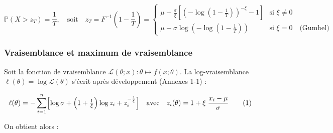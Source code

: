 \documentclass[
  article,
  nofooter,
  noheadings]{jss}
\begin{document}
\begin{tcolorbox}[enhanced jigsaw, arc=.35mm, left=2mm, rightrule=.15mm, breakable, colframe=quarto-callout-color-frame, colback=white, bottomrule=.15mm, opacityback=0, leftrule=.75mm, toprule=.15mm]

\[
\mathbb{P}(X > z_T) = \frac{1}{T}, \quad \text{soit} \quad z_T = F^{-1}\left(1 - \frac{1}{T} \right) = 
\begin{cases}
\mu + \frac{\sigma}{\xi} \left[ \left( -\log\left(1 - \frac{1}{T}\right) \right)^{-\xi} - 1 \right] & \text{si } \xi \ne 0 \\
\mu - \sigma \log \left( -\log\left(1 - \frac{1}{T} \right) \right) & \text{si } \xi = 0 \quad \text{(Gumbel)}
\end{cases}
\]

\end{tcolorbox}

\subsubsection{Vraisemblance et maximum de
vraisemblance}\label{vraisemblance-et-maximum-de-vraisemblance}

Soit la fonction de vraisemblance
\({\displaystyle {\mathcal {L}}(\theta ;x)} : {\displaystyle \theta \mapsto f(x;\theta )}\).
La log-vraisemblance \(\ell(\theta) = \log \mathcal{L}(\theta)\) s'écrit
après développement (Annexes 1-1) :

\begin{tcolorbox}[enhanced jigsaw, arc=.35mm, left=2mm, rightrule=.15mm, breakable, colframe=quarto-callout-color-frame, colback=white, bottomrule=.15mm, opacityback=0, leftrule=.75mm, toprule=.15mm]

\[
\ell(\theta)=
-\sum_{i=1}^n\Bigl[
\log\sigma
+\Bigl(1+\tfrac1{\xi}\Bigr)\log z_i
+z_i^{-\frac{1}{\xi}}
\Bigr]
\quad \text{avec} \quad  z_i(\theta)=1+\xi\;\frac{x_i-\mu}{\sigma}
\tag{1}
\]

\end{tcolorbox}

On obtient alors :
\end{document}
